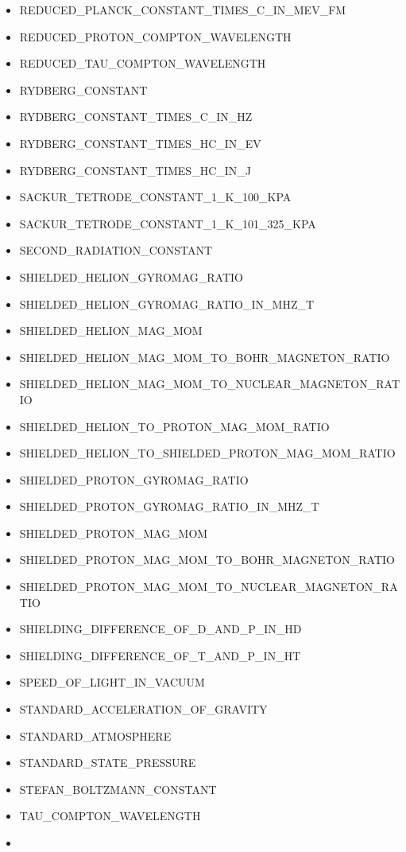 \begin{itemize}
\item
  REDUCED\_PLANCK\_CONSTANT\_TIMES\_C\_IN\_MEV\_FM
\item
  REDUCED\_PROTON\_COMPTON\_WAVELENGTH
\item
  REDUCED\_TAU\_COMPTON\_WAVELENGTH
\item
  RYDBERG\_CONSTANT
\item
  RYDBERG\_CONSTANT\_TIMES\_C\_IN\_HZ
\item
  RYDBERG\_CONSTANT\_TIMES\_HC\_IN\_EV
\item
  RYDBERG\_CONSTANT\_TIMES\_HC\_IN\_J
\item
  SACKUR\_TETRODE\_CONSTANT\_1\_K\_100\_KPA
\item
  SACKUR\_TETRODE\_CONSTANT\_1\_K\_101\_325\_KPA
\item
  SECOND\_RADIATION\_CONSTANT
\item
  SHIELDED\_HELION\_GYROMAG\_RATIO
\item
  SHIELDED\_HELION\_GYROMAG\_RATIO\_IN\_MHZ\_T
\item
  SHIELDED\_HELION\_MAG\_MOM
\item
  SHIELDED\_HELION\_MAG\_MOM\_TO\_BOHR\_MAGNETON\_RATIO
\item
  SHIELDED\_HELION\_MAG\_MOM\_TO\_NUCLEAR\_MAGNETON\_RATIO
\item
  SHIELDED\_HELION\_TO\_PROTON\_MAG\_MOM\_RATIO
\item
  SHIELDED\_HELION\_TO\_SHIELDED\_PROTON\_MAG\_MOM\_RATIO
\item
  SHIELDED\_PROTON\_GYROMAG\_RATIO
\item
  SHIELDED\_PROTON\_GYROMAG\_RATIO\_IN\_MHZ\_T
\item
  SHIELDED\_PROTON\_MAG\_MOM
\item
  SHIELDED\_PROTON\_MAG\_MOM\_TO\_BOHR\_MAGNETON\_RATIO
\item
  SHIELDED\_PROTON\_MAG\_MOM\_TO\_NUCLEAR\_MAGNETON\_RATIO
\item
  SHIELDING\_DIFFERENCE\_OF\_D\_AND\_P\_IN\_HD
\item
  SHIELDING\_DIFFERENCE\_OF\_T\_AND\_P\_IN\_HT
\item
  SPEED\_OF\_LIGHT\_IN\_VACUUM
\item
  STANDARD\_ACCELERATION\_OF\_GRAVITY
\item
  STANDARD\_ATMOSPHERE
\item
  STANDARD\_STATE\_PRESSURE
\item
  STEFAN\_BOLTZMANN\_CONSTANT
\item
  TAU\_COMPTON\_WAVELENGTH
\item

\end{itemize}
